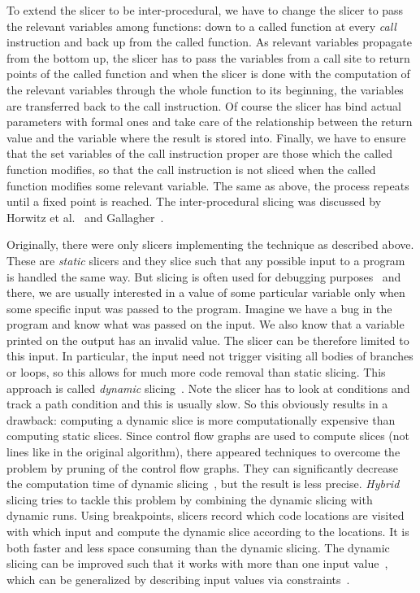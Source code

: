 To extend the slicer to be inter-procedural, we have to change the slicer to
pass the relevant variables among functions: down to a called function at
every \emph{call} instruction and back up from the called function. As relevant
variables propagate from the bottom up, the slicer has to pass the variables
from a call site to return points of the called function and when the slicer
is done with the computation of the relevant variables through the whole
function to its beginning, the variables are transferred back to the call
instruction. Of course the slicer has bind actual parameters with formal ones
and take care of the relationship between the return value and the variable
where the result is stored into. Finally, we have to ensure that the set
variables of the call instruction proper are those which the called function
modifies, so that the call instruction is not sliced when the called function
modifies some relevant variable.  The same as above, the process repeats until
a fixed point is reached. The inter-procedural slicing was discussed by
Horwitz et al.~\cite{slic_inter1} and Gallagher~\cite{slic_inter2}.

Originally, there were only slicers implementing the technique as described
above. These are \emph{static} slicers and they slice such that any possible
input to a program is handled the same way. But slicing is often used for
debugging purposes~\cite{slicing_debugging} and there, we are usually
interested in a value of some particular variable only when some specific
input was passed to the program.  Imagine we have a bug in the program and
know what was passed on the input. We also know that a variable printed on the
output has an invalid value. The slicer can be therefore limited to this
input. In particular, the input need not trigger visiting all bodies of
branches or loops, so this allows for much more code removal than static
slicing.  This approach is called \emph{dynamic} slicing~\cite{slicing_dyn}.
Note the slicer has to look at conditions and track a path condition and this
is usually slow. So this obviously results in a drawback: computing a dynamic
slice is more computationally expensive than computing static slices. Since
control flow graphs are used to compute slices (not lines like in the original
algorithm), there appeared techniques to overcome the problem by pruning of
the control flow graphs. They can significantly decrease the computation time
of dynamic slicing~\cite{slic_prunecfg1, slic_prunecfg2}, but the result is
less precise.  \emph{Hybrid} slicing tries to tackle this problem by combining
the dynamic slicing with dynamic runs.  Using breakpoints, slicers record
which code locations are visited with which input and compute the dynamic
slice according to the locations.  It is both faster and less space consuming
than the dynamic slicing.  The dynamic slicing can be improved such that it
works with more than one input value~\cite{slic_quasi, slic_union}, which can
be generalized by describing input values via
constraints~\cite{slic_constraint, slic_constraint_bw}.

